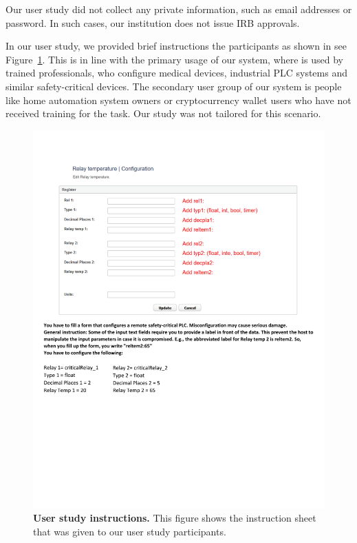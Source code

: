  Our user study did not collect any private information, such as email addresses or password. In such cases, our institution does not issue IRB approvals.

 In our user study, we provided brief instructions the participants as shown in see Figure~\ref{fig:userStudyInstruction}. This is in line with the primary usage of our system, where \name is used by trained professionals, who configure medical devices, industrial PLC systems and similar safety-critical devices. The secondary user group of our system is people like home automation system owners or cryptocurrency wallet users who have not received training for the task. Our study was not tailored for this scenario.


\begin{figure}[t]
 \centering
 \includegraphics[trim={0 8cm 0 2cm}, clip,width=\linewidth]{chapters/IntegriKey/images/userStudy.pdf}
 \caption{\textbf{User study instructions.} This figure shows the instruction sheet that was given to our user study participants.}
 \label{fig:userStudyInstruction}
\end{figure}

